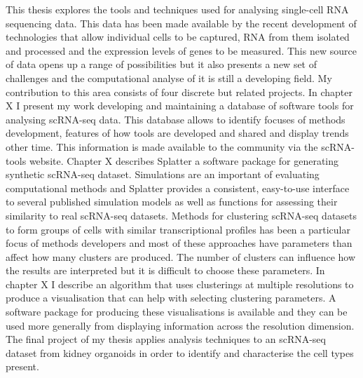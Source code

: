 \documentclass[11pt,a4paper,titlepage,twoside,openright]{style/unimelbthesis}
\theoremstyle{definition}
\theoremstyle{definition}
\theoremstyle{definition}
\theoremstyle{remark}
\begin{document}
\begin{mainmatter}
This thesis explores the tools and techniques used for analysing single-cell RNA sequencing data. This data has been made available by the recent development of technologies that allow individual cells to be captured, RNA from them isolated and processed and the expression levels of genes to be measured. This new source of data opens up a range of possibilities but it also presents a new set of challenges and the computational analyse of it is still a developing field. My contribution to this area consists of four discrete but related projects. In chapter X I present my work developing and maintaining a database of software tools for analysing scRNA-seq data. This database allows to identify focuses of methods development, features of how tools are developed and shared and display trends other time. This information is made available to the community via the scRNA-tools website. Chapter X describes Splatter a software package for generating synthetic scRNA-seq dataset. Simulations are an important of evaluating computational methods and Splatter provides a consistent, easy-to-use interface to several published simulation models as well as functions for assessing their similarity to real scRNA-seq datasets. Methods for clustering scRNA-seq datasets to form groups of cells with similar transcriptional profiles has been a particular focus of methods developers and most of these approaches have parameters than affect how many clusters are produced. The number of clusters can influence how the results are interpreted but it is difficult to choose these parameters. In chapter X I describe an algorithm that uses clusterings at multiple resolutions to produce a visualisation that can help with selecting clustering parameters. A software package for producing these visualisations is available and they can be used more generally from displaying information across the resolution dimension. The final project of my thesis applies analysis techniques to an scRNA-seq dataset from kidney organoids in order to identify and characterise the cell types present.


\end{mainmatter}
\end{document}
